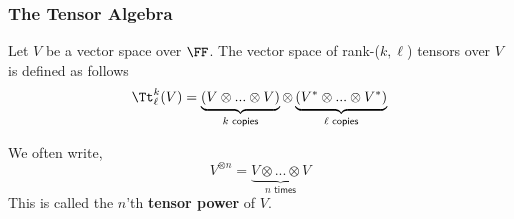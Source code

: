 \subsubsection{The Tensor Algebra}
\begin{defn}
    Let $V$ be a vector space over $\FF$. The vector space of rank-($k,\ell$) tensors over $V$ is defined as follows
    \begin{equation}
        \Tt_\ell^k(V) = \underbrace{(V\otimes...\otimes V) }_{k \textsf{ copies}}\otimes \underbrace{(V^*\otimes...\otimes V^*)}_{\ell \textsf{ copies}}
    \end{equation}
\end{defn}
\begin{defn}
    We often write,
    \begin{equation}
        V^{\otimes n} = \underbrace{V\otimes ... \otimes V}_{n \textsf{ times}}
    \end{equation}
    This is called the $n$'th \textbf{tensor power} of $V$.
\end{defn}

